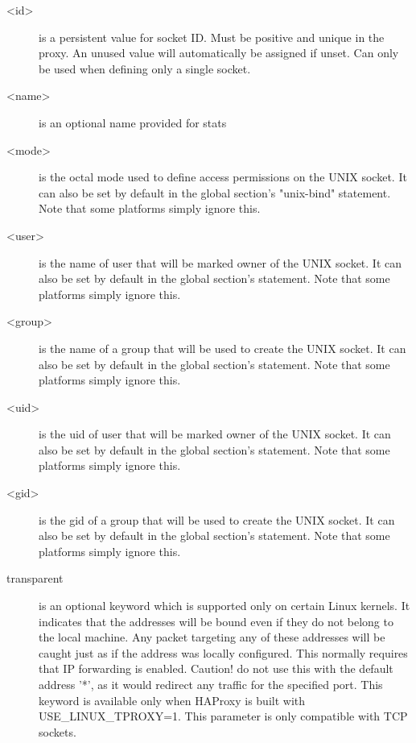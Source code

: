 \begin{description}
  \item[<id>]          is a persistent value for socket ID. Must be positive and
                  unique in the proxy. An unused value will automatically be
                  assigned if unset. Can only be used when defining only a
                  single socket.

  \item[<name>]        is an optional name provided for stats

  \item[<mode>]        is the octal mode used to define access permissions on the
                  UNIX socket. It can also be set by default in the global
                  section's "unix-bind" statement. Note that some platforms
                  simply ignore this.

  \item[<user>]        is the name of user that will be marked owner of the UNIX
                  socket.  It can also be set by default in the global
                  section's  statement. Note that some platforms
                  simply ignore this.

  \item[<group>]       is the name of a group that will be used to create the UNIX
                  socket. It can also be set by default in the global section's
                   statement. Note that some platforms simply ignore
                  this.

  \item[<uid>]         is the uid of user that will be marked owner of the UNIX
                  socket. It can also be set by default in the global section's
                   statement. Note that some platforms simply ignore
                  this.

  \item[<gid>]         is the gid of a group that will be used to create the UNIX
                  socket. It can also be set by default in the global section's
                   statement. Note that some platforms simply ignore
                  this.

  \item[transparent]   is an optional keyword which is supported only on certain
                  Linux kernels. It indicates that the addresses will be bound
                  even if they do not belong to the local machine. Any packet
                  targeting any of these addresses will be caught just as if
                  the address was locally configured. This normally requires
                  that IP forwarding is enabled. Caution! do not use this with
                  the default address '*', as it would redirect any traffic for
                  the specified port. This keyword is available only when
                  HAProxy is built with USE\_LINUX\_TPROXY=1. This parameter is
                  only compatible with TCP sockets.


\end{description}
